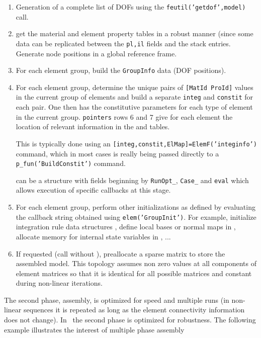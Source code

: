 \begin{enumerate}
 \item Generation of a complete list of DOFs using the {\tt feutil('getdof',model)} call.
 \item get the material and element property tables in a robust manner (since some data can be replicated between the {\tt pl,il} fields and the  stack entries. Generate node positions in a global reference frame.

 \item For each element group, build the {\tt GroupInfo} data (DOF positions).
 \item For each element group, determine the unique pairs of {\tt [MatId ProId]} values in the current group of elements and build a separate {\tt integ} and {\tt constit} for each pair. One then has the constitutive parameters for each type of element in the current group. {\tt pointers} rows 6 and 7 give for each element the location of relevant information in the  and  tables.

This is typically done using an {\tt [integ,constit,ElMap]=ElemF('integinfo')} command, which in most cases is really being passed directly to a {\tt p\_fun('BuildConstit')} command. 

 can be a structure with fields beginning by {\tt RunOpt\_},  {\tt Case\_} and {\tt eval} which allows execution of specific callbacks at this stage.

\item For each element group, perform other initializations as defined by evaluating the callback string obtained using {\tt elem('GroupInit')}. For example, initialize integration rule data structures , define local bases or normal maps in , allocate memory for internal state variables in , ...

\item If requested (call without ), preallocate a sparse matrix to store the assembled model. This topology assumes non zero values at all components of element matrices so that it is identical for all possible matrices and constant during non-linear iterations.
 
\end{enumerate}


The second phase, assembly, is optimized for speed and multiple runs (in non-linear sequences it is repeated as long as the element connectivity information does not change). In \femk\ the second phase is optimized for robustness.  The following example illustrates the interest of multiple phase assembly


